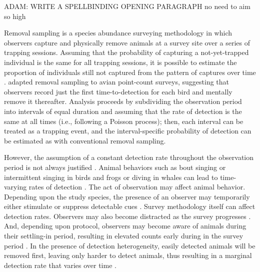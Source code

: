 \documentclass[useAMS,usenatbib,referee,12pt]{article}
\newcommand{\adam}[1]{{\color{blue} ADAM: #1}}
\newcommand{\jarad}[1]{{\color{red} #1}}
\begin{document}
\adam{WRITE A SPELLBINDING OPENING PARAGRAPH}\jarad{no need to aim so high}


Removal sampling is a species abundance surveying methodology in which observers capture and physically remove animals at a survey site over a series of trapping sessions.  Assuming that the probability of capturing a not-yet-trapped individual is the same for all trapping sessions, it is possible to estimate the proportion of individuals still not captured from the pattern of captures over time \citep{Moran1951, Zippin1958, Seber1982}.  \citet{Farnsworth2002} adapted removal sampling to avian point-count surveys, suggesting that observers record just the first time-to-detection for each bird and mentally remove it thereafter.  Analysis proceeds by subdividing the observation period into intervals of equal duration and assuming that the rate of detection is the same at all times (i.e., following a Poisson process); then, each interval can be treated as a trapping event, and the interval-specific probability of detection can be estimated as with conventional removal sampling.

However, the assumption of a constant detection rate throughout the observation period is not always justified \citep{Alldredge2007}.  Animal behaviors such as bout singing or intermittent singing in birds and frogs or diving in whales can lead to time-varying rates of detection \citep{Scott2005, Diefenbach2007, Reidy2011}.  The act of observation may affect animal behavior.  Depending upon the study species, the presence of an observer may temporarily either stimulate or suppress detectable cues \citep{McSheaRappole1997, Rosenstock2002, Alldredge2007}.  Survey methodology itself can affect detection rates.  Observers may also become distracted as the survey progresses \citep{Johnson2008}.  And, depending upon protocol, observers may become aware of animals during their settling-in period, resulting in elevated counts early during in the survey period \citep{LeeMarsden2008}.  In the presence of detection heterogeneity, easily detected animals will be removed first, leaving only harder to detect animals, thus resulting in a marginal detection rate that varies over time \citep{Farnsworth2005}.
\end{document}

